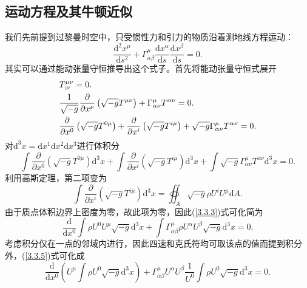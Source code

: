 \documentclass[11pt, a4paper, oneside, onecolumn]{ctexart}
\numberwithin{equation}{subsection}
\begin{document}
\subsection{运动方程及其牛顿近似}
我们先前提到过黎曼时空中，只受惯性力和引力的物质沿着测地线方程运动：
\begin{equation}
\frac{\mathrm{d}^{2}x^{\mu}}{\mathrm{d}s^{2}}+\Gamma_{\alpha\beta}^{\mu}\frac{\mathrm{d}x^{\alpha}}{\mathrm{d}s}\frac{\mathrm{d}x^{\beta}}{\mathrm{d}s}=0.
\end{equation}
其实可以通过能动张量守恒推导出这个式子。首先将能动张量守恒式展开
\begin{align}
&T^{\mu\nu}_{;\nu}=0.\\
&\frac{1}{\sqrt{-g}}\frac{\partial{}}{\partial{}x^{\nu}}\left(\sqrt{-g}T^{\mu\nu}\right)+\Gamma_{\alpha\nu}^{\mu}T^{\alpha\nu}=0.\notag\\
&\frac{\partial{}}{\partial{}x^{0}}\left(\sqrt{-g}T^{0\mu}\right)+\frac{\partial{}}{\partial{}x^{i}}\left(\sqrt{-g}T^{i\mu}\right)+\sqrt{-g}\Gamma_{\alpha\nu}^{\mu}T^{\alpha\nu}=0.\notag
\end{align}
对$\mathrm{d}^{3}x=\mathrm{d}x^{1}\mathrm{d}x^{2}\mathrm{d}x^{3}$进行体积分
\begin{equation}
\int\frac{\partial{}}{\partial{}x^{0}}\left(\sqrt{-g}T^{0\mu}\right)\mathrm{d}^{3}x+\int\frac{\partial{}}{\partial{}x^{i}}\left(\sqrt{-g}T^{i\mu}\right)\mathrm{d}^{3}x+\int\sqrt{-g}\Gamma_{\alpha\nu}^{\mu}T^{\alpha\nu}\mathrm{d}^{3}x=0.\label{3.3.3}
\end{equation}
利用高斯定理，第二项变为
\begin{equation}
\int\frac{\partial{}}{\partial{}x^{i}}\left(\sqrt{-g}T^{i\mu}\right)\mathrm{d}^{3}x=\oiint_{A}\sqrt{-g}\rho U^{i}U^{\mu}\mathrm{d}A.
\end{equation}
由于质点体积边界上密度为零，故此项为零，因此(\ref{3.3.3})式可化简为
\begin{equation}
\frac{\mathrm{d}}{\mathrm{d}x^{0}}\int\rho U^{0}U^{\mu}\sqrt{-g}\mathrm{d}^{3}x+\int\Gamma_{\alpha\beta}^{\mu}\rho U^{\alpha}U^{\beta}\sqrt{-g}\mathrm{d}^{3}x=0.\label{3.3.5}
\end{equation}
考虑积分仅在一点的邻域内进行，因此四速和克氏符均可取该点的值而提到积分外，(\ref{3.3.5})式可化成
\begin{equation}
\frac{\mathrm{d}}{\mathrm{d}x^{0}}\left(U^{\mu}\int\rho U^{0}\sqrt{-g}\mathrm{d}^{3}x\right)+\Gamma_{\alpha\beta}^{\mu}U^{\alpha}U^{\beta}\frac{1}{U^{0}}\int\rho U^{0}\sqrt{-g}\mathrm{d}^{3}x=0.\label{3.3.6}
\end{equation}
\end{document}

